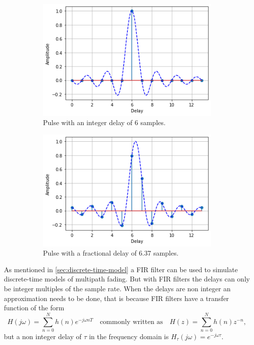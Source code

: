 \begin{figure}
	\centering
	\begin{subfigure}{.45\linewidth}
		\includegraphics[width=\linewidth]{./figures/screenshots/Fractional_delay_6}
		\caption{Pulse with an integer delay of 6 samples.}
	\end{subfigure}
	\hskip 5mm
	\begin{subfigure}{.45\linewidth}
		\includegraphics[width=\linewidth]{./figures/screenshots/Fractional_delay_637}
		\caption{Pulse with a fractional delay of 6.37 samples.}
	\end{subfigure}
	\caption{\label{fig:fractional-delay-sinc-plot}}
\end{figure}

As mentioned in \ref{sec:discrete-time-model} a FIR filter can be used to simulate discrete-time models of multipath fading. But with FIR filters the delays can only be integer multiples of the sample rate. When the delays are non integer an approximation needs to be done, that is because FIR filters have a transfer function of the form
\begin{equation} \label{eqn:transfer-function-fir}
	H(j\omega) = \sum_{n = 0}^{N} h(n) e^{-j\omega nT}
	\quad \text{commonly written as} \quad
	H(z) = \sum_{n = 0}^{N} h(n) z^{-n},
\end{equation}
but a non integer delay of \(\tau\) in the frequency domain is \(H_\tau(j\omega) = e^{-j\omega \tau}\).

